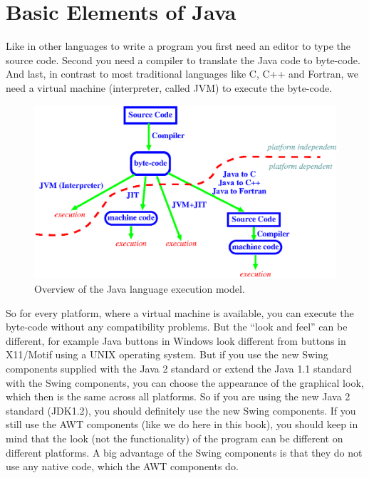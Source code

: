 \section{Basic Elements of Java}
\label{sec:Basic_elements_of_Java}
Like in other languages to write a program you first need an editor
to type the source code. Second you need a compiler to translate
the Java code to byte-code. And last, in contrast to most
traditional languages like C, C++ and Fortran, we need a virtual
machine (interpreter, called JVM) to execute the byte-code.

\begin{figure}[htbp]
  \begin{center}
    \leavevmode
    \includegraphics{Figures/Java_Overview.eps}
    \caption{Overview of the Java language execution model.}
    \label{fig:Java_Overview}
  \end{center}
\end{figure}

So for every platform, where a virtual machine is available,
you can execute the byte-code without any compatibility problems.
But the ``look and feel'' can be different, for example Java buttons
in Windows look different from buttons in X11/Motif using a UNIX
operating system. But if you use the new Swing components supplied
with the Java 2 standard or extend the Java 1.1 standard with the Swing
components, you can choose the appearance of the graphical look, which then
is the same across all platforms. So if you are using the new Java 2 standard
(JDK1.2), you should definitely use the new Swing components. If you
still use the AWT components (like we do here in this book), you should
keep in mind that the look (not the functionality) 
of the program can be different on different platforms. 
A big advantage of the Swing components is that they do not use any
native code, which the AWT components do.

